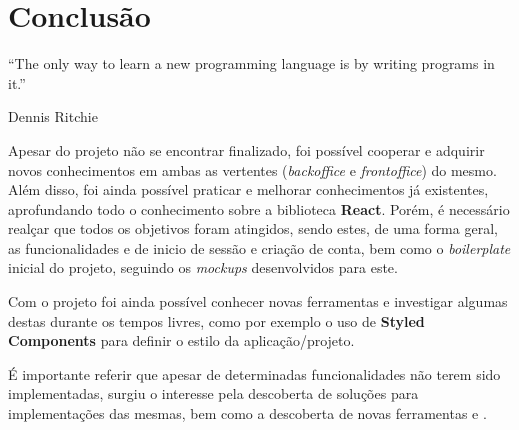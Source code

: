 \chapter{Conclusão}

\begin{flushright}
	\begin{quotebox50}
		\large
		“The only way to learn a new programming language is by writing programs in it.”

		\tcblower
		Dennis Ritchie
	\end{quotebox50}
\end{flushright}

Apesar do projeto não se encontrar finalizado, foi possível cooperar e adquirir novos conhecimentos em ambas as vertentes (\textit{backoffice} e \textit{frontoffice}) do mesmo. Além disso, foi ainda possível praticar e melhorar conhecimentos já existentes, aprofundando todo o conhecimento sobre a biblioteca \textbf{React}. Porém, é necessário realçar que todos os objetivos foram atingidos, sendo estes, de uma forma geral, as funcionalidades e \textit{} de inicio de sessão e criação de conta, bem como o \textit{boilerplate} inicial do projeto, seguindo os \textit{mockups} desenvolvidos para este.

Com o projeto foi ainda possível conhecer novas ferramentas e investigar algumas destas durante os tempos livres, como por exemplo o uso de \textbf{Styled Components} para definir o estilo da aplicação/projeto.

É importante referir que apesar de determinadas funcionalidades não terem sido implementadas, surgiu o interesse pela descoberta de soluções para implementações das mesmas, bem como a descoberta de novas ferramentas e \textit{}.



